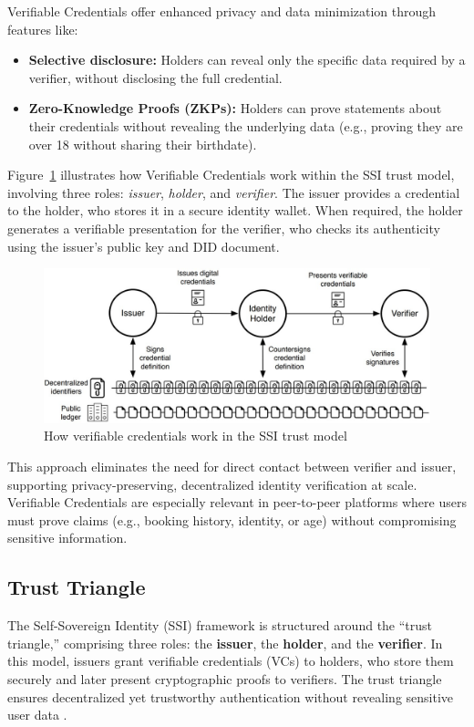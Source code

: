 \documentclass[conference]{IEEEtran}
\begin{document}
Verifiable Credentials offer enhanced privacy and data minimization through features like:
\begin{itemize}
  \item \textbf{Selective disclosure:} Holders can reveal only the specific data required by a verifier, without disclosing the full credential.
  \item \textbf{Zero-Knowledge Proofs (ZKPs):} Holders can prove statements about their credentials without revealing the underlying data (e.g., proving they are over 18 without sharing their birthdate).
\end{itemize}

Figure~\ref{fig:vc-work} illustrates how Verifiable Credentials work within the SSI trust model, involving three roles: \textit{issuer}, \textit{holder}, and \textit{verifier}. The issuer provides a credential to the holder, who stores it in a secure identity wallet. When required, the holder generates a verifiable presentation for the verifier, who checks its authenticity using the issuer’s public key and DID document.

\begin{figure}[ht]
    \centering
    \includegraphics[width=0.99\linewidth]{how-vc-work.jpg}
    \caption{How verifiable credentials work in the SSI trust model \cite{lux2020}}
    \label{fig:vc-work}
\end{figure}

This approach eliminates the need for direct contact between verifier and issuer, supporting privacy-preserving, decentralized identity verification at scale. Verifiable Credentials are especially relevant in peer-to-peer platforms where users must prove claims (e.g., booking history, identity, or age) without compromising sensitive information.

\subsection{Trust Triangle}
The Self-Sovereign Identity (SSI) framework is structured around the “trust triangle,” comprising three roles: the \textbf{issuer}, the \textbf{holder}, and the \textbf{verifier}. In this model, issuers grant verifiable credentials (VCs) to holders, who store them securely and later present cryptographic proofs to verifiers. The trust triangle ensures decentralized yet trustworthy authentication without revealing sensitive user data \cite{sporny2022, lux2020}. 
\end{document}
